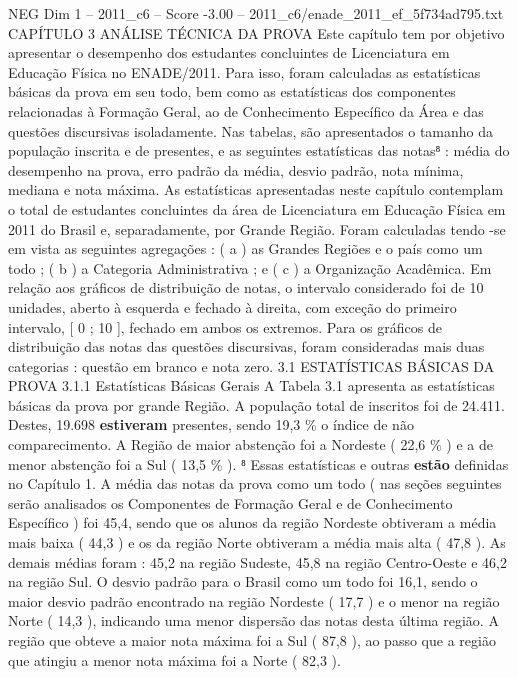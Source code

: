 \begin{textsample}{NEG Dim 1 – 2011\_c6 – Score -3.00 – 2011\_c6/enade\_2011\_ef\_5f734ad795.txt}  \label{ex:f1_neg_230}
CAPÍTULO 3 ANÁLISE TÉCNICA DA PROVA Este capítulo tem por objetivo apresentar o desempenho dos estudantes concluintes de Licenciatura em Educação Física no ENADE/2011.
Para isso, foram calculadas as estatísticas básicas da prova em seu todo, bem como as estatísticas dos componentes relacionadas à Formação Geral, ao de Conhecimento Específico da Área e das questões discursivas isoladamente.
Nas tabelas, são apresentados o tamanho da população inscrita e de presentes, e as seguintes estatísticas das notas⁸ : média do desempenho na prova, erro padrão da média, desvio padrão, nota mínima, mediana e nota máxima.
As estatísticas apresentadas neste capítulo contemplam o total de estudantes concluintes da área de Licenciatura em Educação Física em 2011 do Brasil e, separadamente, por Grande Região.
Foram calculadas tendo -se em vista as seguintes agregações : ( a ) as Grandes Regiões e o país como um todo ; ( b ) a Categoria Administrativa ; e ( c ) a Organização Acadêmica.
Em relação aos gráficos de distribuição de notas, o intervalo considerado foi de 10 unidades, aberto à esquerda e fechado à direita, com exceção do primeiro intervalo, [ 0 ; 10 ], fechado em ambos os extremos.
Para os gráficos de distribuição das notas das questões discursivas, foram consideradas mais duas categorias : questão em branco e nota zero. 3.1 ESTATÍSTICAS BÁSICAS DA PROVA 3.1.1 Estatísticas Básicas Gerais A Tabela 3.1 apresenta as estatísticas básicas da prova por grande Região.
A população total de inscritos foi de 24.411.
Destes, 19.698 \textbf{estiveram} presentes, sendo 19,3 \% o índice de não comparecimento.
A Região de maior abstenção foi a Nordeste ( 22,6 \% ) e a de menor abstenção foi a Sul ( 13,5 \% ). ⁸ Essas estatísticas e outras \textbf{estão} definidas no Capítulo 1.
A média das notas da prova como um todo ( nas seções seguintes serão analisados os Componentes de Formação Geral e de Conhecimento Específico ) foi 45,4, sendo que os alunos da região Nordeste obtiveram a média mais baixa ( 44,3 ) e os da região Norte obtiveram a média mais alta ( 47,8 ).
As demais médias foram : 45,2 na região Sudeste, 45,8 na região Centro-Oeste e 46,2 na região Sul.
O desvio padrão para o Brasil como um todo foi 16,1, sendo o maior desvio padrão encontrado na região Nordeste ( 17,7 ) e o menor na região Norte ( 14,3 ), indicando uma menor dispersão das notas desta última região.
A região que obteve a maior nota máxima foi a Sul ( 87,8 ), ao passo que a região que atingiu a menor nota máxima foi a Norte ( 82,3 ).

\end{textsample}
